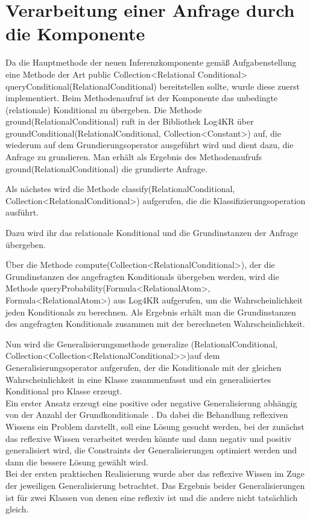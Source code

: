 \documentclass[a4paper, 11pt]{book}
\begin{document}
\section{Verarbeitung einer Anfrage durch die Komponente}
Da die Hauptmethode der neuen Inferenzkomponente gemäß Aufgabenstellung eine Methode der Art public Collection<Relational Conditional> queryConditional(RelationalConditional) bereitstellen sollte, wurde diese zuerst  implementiert. Beim Methodenaufruf ist der Komponente das unbedingte (relationale) Konditional zu übergeben.
Die Methode ground(RelationalConditional) ruft in der Bibliothek Log4KR über groundConditional(RelationalConditional, Collection<Constant>) auf, die wiederum auf dem Grundierungsoperator ausgeführt wird und dient dazu, die Anfrage zu grundieren. Man erhält als Ergebnis des Methodenaufrufs ground(RelationalConditional) die grundierte Anfrage.

Als nächstes wird die Methode classify(RelationalConditional, Collection<RelationalConditional>) aufgerufen, die die Klassifizierungsoperation ausführt.

Dazu wird ihr das relationale Konditional und die Grundinstanzen der Anfrage übergeben.

Über die Methode compute(Collection<RelationalConditional>), der die Grundinstanzen des angefragten Konditionals übergeben werden, wird die Methode queryProbability(Formula<RelationalAtom>, Formula<RelationalAtom>) aus Log4KR aufgerufen, um die Wahrscheinlichkeit jeden Konditionals zu berechnen. Als Ergebnis erhält man die Grundinstanzen des angefragten Konditionals zusammen mit der berechneten Wahrscheinlichkeit.

Nun wird die Generalisierungsmethode generalize (RelationalConditional, Collection<Collection<RelationalConditional>>)auf dem  Generalisierungsoperator aufgerufen, der die Konditionale mit der gleichen Wahrscheinlichkeit in eine Klasse zusammenfasst und ein generalisiertes Konditional pro Klasse erzeugt.\\
Ein erster Ansatz erzeugt eine positive oder negative Generalisierung   abhängig von der Anzahl der Grundkonditionale . Da dabei die Behandlung reflexiven Wissens ein Problem darstellt, soll eine Lösung gesucht werden, bei der zunächst das reflexive Wissen verarbeitet werden könnte und dann negativ und positiv generalisiert wird, die Constraints der Generalisierungen optimiert werden und dann die bessere Lösung gewählt wird. \\
Bei der ersten praktischen Realisierung wurde aber das reflexive Wissen im Zuge der jeweiligen Generalisierung betrachtet. Das Ergebnis beider Generalisierungen ist für zwei Klassen von denen eine reflexiv ist und die andere nicht tatsächlich gleich.\\
\end{document}
